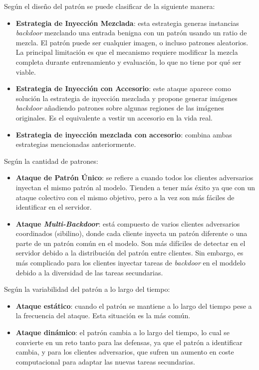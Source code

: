 \begin{enumerate}
\begin{itemize}
        Según el diseño del patrón se puede clasificar de la siguiente manera:
        \begin{itemize}
            \item \textbf{Estrategia de Inyección Mezclada}: esta estrategia generas instancias \textit{backdoor} mezclando una entrada benigna con un patrón usando un ratio de mezcla. El patrón puede ser cualquier imagen, o incluso patrones aleatorios. La principal limitación es que el mecanismo requiere modificar la mezcla completa durante entrenamiento y evaluación, lo que no tiene por qué ser viable.
            \item \textbf{Estrategia de Inyección con Accesorio}: este ataque aparece como solución la estrategia de inyección mezclada y propone generar imágenes \textit{backdoor} añadiendo patrones sobre algunas regiones de las imágenes originales. Es el equivalente a vestir un accesorio en la vida real.
            \item \textbf{Estrategia de inyección mezclada con accesorio}: combina ambas estrategias mencionadas anteriormente.
        \end{itemize}
        

        Según la cantidad de patrones:
        \begin{itemize}
            \item \textbf{Ataque de Patrón Único}: se refiere a cuando todos los clientes adversarios inyectan el mismo patrón al modelo. Tienden a tener más éxito ya que con un ataque colectivo con el mismo objetivo, pero a la vez son más fáciles de identificar en el servidor.
            \item \textbf{Ataque \textit{Multi-Backdoor}}: está compuesto de varios clientes adversarios coordinados (sibilino), donde cada cliente inyecta un patrón diferente o una parte de un patrón común en el modelo. Son más difíciles de detectar en el servidor debido a la distribución del patrón entre clientes. Sin embargo, es más complicado para los clientes inyectar tareas de \textit{backdoor} en el moddelo debido a la diversidad de las tareas secundarias.
        \end{itemize}
        

        Según la variabilidad del patrón a lo largo del tiempo:
        \begin{itemize}
            \item \textbf{Ataque estático}: cuando el patrón se mantiene a lo largo del tiempo pese a la frecuencia del ataque. Esta situación es la más común.
            \item \textbf{Ataque dinámico}: el patrón cambia a lo largo del tiempo, lo cual se convierte en un reto tanto para las defensas, ya que el patrón a identificar cambia, y para los clientes adversarios, que sufren un aumento en coste computacional para adaptar las nuevas tareas secundarias.
        \end{itemize}


\end{itemize}
\end{enumerate}
